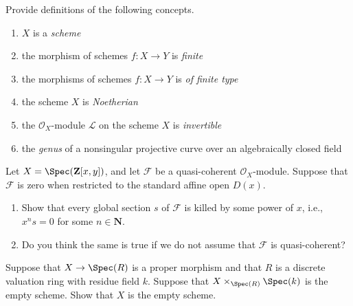 \begin{exercise}[Definitions]
\label{exercise-definitions}
Provide definitions of the following concepts.
\begin{enumerate}
\item $X$ is a {\it scheme}
\item the morphism of schemes $f : X \to Y$ is {\it finite}
\item the morphisms of schemes $f : X \to Y$ is {\it of finite type}
\item the scheme $X$ is {\it Noetherian}
\item the ${\mathcal O}_X$-module ${\mathcal L}$ on
the scheme $X$ is {\it invertible}
\item the {\it genus} of a nonsingular
projective curve over an algebraically closed field
\end{enumerate}
\end{exercise}

\begin{exercise}
\label{exercise-kill-global-sections}
Let $X = \Spec({\mathbf Z}[x, y])$, and let ${\mathcal F}$ be a
quasi-coherent
${\mathcal O}_X$-module. Suppose that ${\mathcal F}$ is zero when restricted to
the
standard affine open $D(x)$.
\begin{enumerate}
\item Show that every global section $s$ of ${\mathcal F}$ is killed by some
power of $x$, i.e., $x^ns = 0$ for some $n\in {\mathbf N}$.
\item Do you think the same is true if we do not assume that ${\mathcal F}$
is quasi-coherent?
\end{enumerate}
\end{exercise}

\begin{exercise}
\label{exercise-empty-fibre-empty}
Suppose that $X \to \Spec(R)$ is a proper morphism and that
$R$ is a discrete valuation ring with residue field $k$. Suppose that
$X \times_{\Spec(R)} \Spec(k)$ is the empty scheme. Show that
$X$ is the empty scheme.
\end{exercise}

